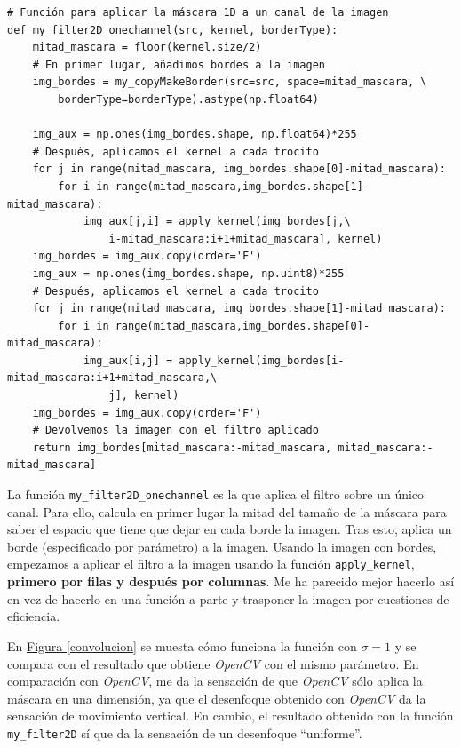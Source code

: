 \documentclass[11pt,a4paper]{article}
\theoremstyle{plain}
\theoremstyle{definition}
\begin{document}
\begin{verbatim}
# Función para aplicar la máscara 1D a un canal de la imagen
def my_filter2D_onechannel(src, kernel, borderType):
    mitad_mascara = floor(kernel.size/2)
    # En primer lugar, añadimos bordes a la imagen
    img_bordes = my_copyMakeBorder(src=src, space=mitad_mascara, \
        borderType=borderType).astype(np.float64)

    img_aux = np.ones(img_bordes.shape, np.float64)*255
    # Después, aplicamos el kernel a cada trocito
    for j in range(mitad_mascara, img_bordes.shape[0]-mitad_mascara):
        for i in range(mitad_mascara,img_bordes.shape[1]-mitad_mascara):
            img_aux[j,i] = apply_kernel(img_bordes[j,\
                i-mitad_mascara:i+1+mitad_mascara], kernel)
    img_bordes = img_aux.copy(order='F')
    img_aux = np.ones(img_bordes.shape, np.uint8)*255
    # Después, aplicamos el kernel a cada trocito
    for j in range(mitad_mascara, img_bordes.shape[1]-mitad_mascara):
        for i in range(mitad_mascara,img_bordes.shape[0]-mitad_mascara):
            img_aux[i,j] = apply_kernel(img_bordes[i-mitad_mascara:i+1+mitad_mascara,\
                j], kernel)
    img_bordes = img_aux.copy(order='F')
    # Devolvemos la imagen con el filtro aplicado
    return img_bordes[mitad_mascara:-mitad_mascara, mitad_mascara:-mitad_mascara]
\end{verbatim}

La función \texttt{my\_filter2D\_onechannel} es la que aplica el filtro sobre un único canal. Para ello, calcula en primer lugar la mitad del tamaño de la máscara para saber el espacio que tiene que dejar en cada borde la imagen. Tras esto, aplica un borde (especificado por parámetro) a la imagen. Usando la imagen con bordes, empezamos a aplicar el filtro a la imagen usando la función \texttt{apply\_kernel}, \textbf{primero por filas y después por columnas}. Me ha parecido mejor hacerlo así en vez de hacerlo en una función a parte y trasponer la imagen por cuestiones de eficiencia.

En \hyperref[convolucion]{Figura \ref*{convolucion}} se muesta cómo funciona la función con $\sigma = 1$ y se compara con el resultado que obtiene \textit{OpenCV} con el mismo parámetro. En comparación con \textit{OpenCV}, me da la sensación de que \textit{OpenCV} sólo aplica la máscara en una dimensión, ya que el desenfoque obtenido con \textit{OpenCV} da la sensación de movimiento vertical. En cambio, el resultado obtenido con la función \texttt{my\_filter2D} sí que da la sensación de un desenfoque ``uniforme''.
\end{document}
